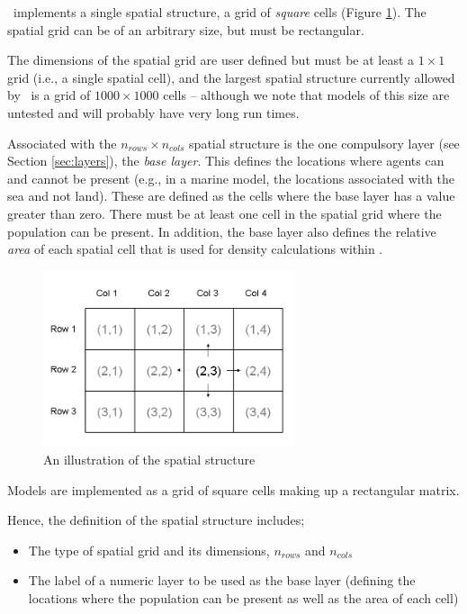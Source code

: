 \IBM\ implements a single spatial structure, a grid of \emph{square} cells (Figure \ref{fig:SquareSpatialStructure}). The spatial grid can be of an arbitrary size, but must be rectangular. 

The dimensions of the spatial grid are user defined but must be at least a $1 \times 1$ grid (i.e., a single spatial cell), and the largest spatial structure currently allowed by \IBM\ is a grid of $1000 \times 1000$ cells -- although we note that models of this size are untested and will probably have very long run times. 

Associated with the $n_{rows} \times n_{cols}$ spatial structure is the one compulsory layer (see Section \ref{sec:layers}), the \emph{base layer}. This defines the locations where agents can and cannot be present (e.g., in a marine model, the locations associated with the sea and not land). These are defined as the cells where the base layer has a value greater than zero. There must be at least one cell in the spatial grid where the population can be present. In addition, the base layer also defines the relative \emph{area} of each spatial cell that is used for density calculations within \IBM.

\begin{figure}[htp]
	\centering
	\includegraphics[width=0.66\textwidth]{Figures/SquareStructure}
	\caption{An illustration of the spatial structure}
	\label{fig:SquareSpatialStructure}
\end{figure}

Models are implemented as a grid of square cells making up a rectangular matrix.

Hence, the definition of the spatial structure includes;
\begin{itemize}
	\item The type of spatial grid and its dimensions, $n_{rows}$ and $n_{cols}$
	\item The label of a numeric layer to be used as the base layer (defining the locations where the population can be present as well as the area of each cell)
\end{itemize}

